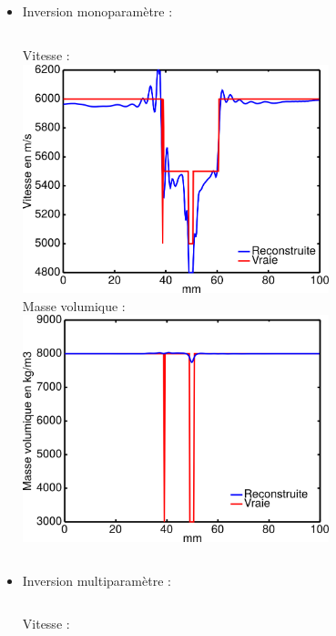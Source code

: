 \documentclass[10pt,xcolor=x11names,compress, notes=show]{beamer}%
\begin{document}
\subsection*{}
\begin{frame}

\begin{itemize}
	\item Inversion monoparamètre : \\[0.2cm]
	\begin{columns}
		\centering
		Vitesse : \\[0.2cm]
		\includegraphics[width=0.7\textwidth]{img/multi/coupe_vp_mono_smooth_hor.png}\\
		\centering
		Masse volumique  : \\[0.2cm]
		\includegraphics[width=0.7\textwidth]{img/multi/coupe_rho_mono.png}\\
	\end{columns}
	\item Inversion multiparamètre : \\[0.2cm]
	\begin{columns}
		\column{0.5\textwidth}
		\centering
		Vitesse : \\[0.2cm]

\end{columns}
\end{itemize}
\end{frame}
\end{document}
